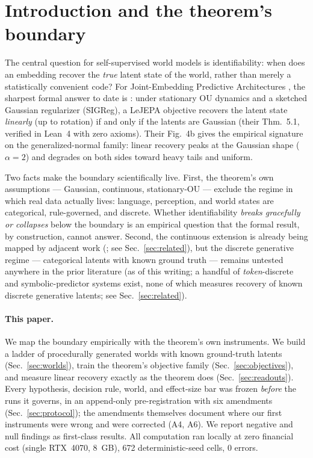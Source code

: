 \documentclass[11pt]{article}
\begin{document}
\section{Introduction and the theorem's boundary}
\label{sec:intro}
The central question for self-supervised world models is identifiability: when
does an embedding recover the \emph{true} latent state of the world, rather
than merely a statistically convenient code? For Joint-Embedding Predictive
Architectures \citep{lecun2022path,assran2023ijepa}, the sharpest formal answer
to date is \citet{klindt2026lejepa}: under stationary OU dynamics and a
sketched Gaussian regularizer (SIGReg), a LeJEPA objective recovers the latent
state \emph{linearly} (up to rotation) if and only if the latents are Gaussian
(their Thm.~5.1, verified in Lean~4 with zero axioms). Their Fig.~4b gives the
empirical signature on the generalized-normal family: linear recovery peaks at
the Gaussian shape ($\alpha=2$) and degrades on both sides toward heavy tails
and uniform.

Two facts make the boundary scientifically live. First, the theorem's own
assumptions --- Gaussian, continuous, stationary-OU --- exclude the regime in
which real data actually lives: language, perception, and world states are
categorical, rule-governed, and discrete. Whether identifiability \emph{breaks
gracefully or collapses} below the boundary is an empirical question that the
formal result, by construction, cannot answer. Second, the continuous
extension is already being mapped by adjacent work
(\citet{arya2026,controlledWM2026}; see Sec.~\ref{sec:related}), but the
discrete generative regime --- categorical latents with known ground truth ---
remains untested anywhere in the prior literature (as of this writing; a
handful of \emph{token}-discrete and symbolic-predictor systems exist, none of
which measures recovery of known discrete generative latents; see
Sec.~\ref{sec:related}).

\paragraph{This paper.}
We map the boundary empirically with the theorem's own instruments. We build a
ladder of procedurally generated worlds with known ground-truth latents
(Sec.~\ref{sec:worlds}), train the theorem's objective family
(Sec.~\ref{sec:objectives}), and measure linear recovery exactly as the theorem
does (Sec.~\ref{sec:readouts}). Every hypothesis, decision rule, world, and
effect-size bar was frozen \emph{before} the runs it governs, in an
append-only pre-registration with six amendments (Sec.~\ref{sec:protocol}); the
amendments themselves document where our first instruments were wrong and were
corrected (A4, A6). We report negative and null findings as first-class
results. All computation ran locally at zero financial cost (single RTX~4070,
8~GB), 672 deterministic-seed cells, 0 errors.
\end{document}
